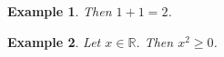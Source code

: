 \documentclass[12pt]{article}
\newtheorem{example}{Example}
\begin{document}
\begin{example}
    Then $1+1=2$.
\end{example}

\begin{example}
    Let $x\in\mathbb{R}$. Then $x^2\ge 0$.
\end{example}
\end{document}
